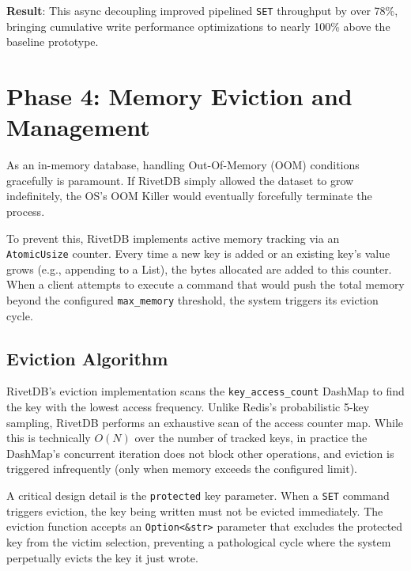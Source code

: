 \textbf{Result}: This async decoupling improved pipelined \texttt{SET} throughput by over 78\%, bringing cumulative write performance optimizations to nearly 100\% above the baseline prototype.

\section{Phase 4: Memory Eviction and Management}

As an in-memory database, handling Out-Of-Memory (OOM) conditions gracefully is paramount. If RivetDB simply allowed the dataset to grow indefinitely, the OS's OOM Killer would eventually forcefully terminate the process.

To prevent this, RivetDB implements active memory tracking via an \texttt{AtomicUsize} counter. Every time a new key is added or an existing key's value grows (e.g., appending to a List), the bytes allocated are added to this counter. When a client attempts to execute a command that would push the total memory beyond the configured \texttt{max\_memory} threshold, the system triggers its eviction cycle.

\subsection{Eviction Algorithm}
RivetDB's eviction implementation scans the \texttt{key\_access\_count} DashMap to find the key with the lowest access frequency. Unlike Redis's probabilistic 5-key sampling, RivetDB performs an exhaustive scan of the access counter map. While this is technically $O(N)$ over the number of tracked keys, in practice the DashMap's concurrent iteration does not block other operations, and eviction is triggered infrequently (only when memory exceeds the configured limit).

A critical design detail is the \texttt{protected} key parameter. When a \texttt{SET} command triggers eviction, the key being written must not be evicted immediately. The eviction function accepts an \texttt{Option<\&str>} parameter that excludes the protected key from the victim selection, preventing a pathological cycle where the system perpetually evicts the key it just wrote.

